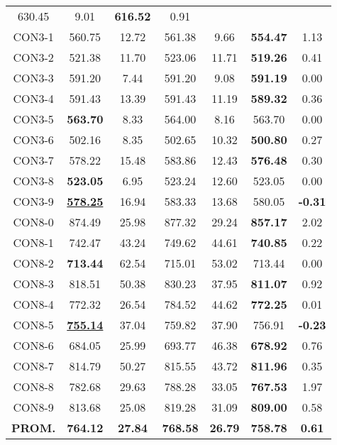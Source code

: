 \begin{table}[ht]
\begin{tabular}{c c c c c c c}
630.45 & 9.01 & \bf{616.52} & 
0.91\\CON3-1 & 560.75 & 12.72 & 
561.38 & 9.66 & \bf{554.47} & 
1.13\\CON3-2 & 521.38 & 11.70 & 
523.06 & 11.71 & \bf{519.26} & 
0.41\\CON3-3 & 591.20 & 7.44 & 
591.20 & 9.08 & \bf{591.19} & 
0.00\\CON3-4 & 591.43 & 13.39 & 
591.43 & 11.19 & \bf{589.32} & 
0.36\\CON3-5 & \bf{563.70} & 8.33 & 
564.00 & 8.16 & 563.70 & 0.00\\
CON3-6 & 502.16 & 8.35 & 
502.65 & 10.32 & \bf{500.80} & 
0.27\\CON3-7 & 578.22 & 15.48 & 
583.86 & 12.43 & \bf{576.48} & 
0.30\\CON3-8 & \bf{523.05} & 6.95 & 
523.24 & 12.60 & 523.05 & 0.00\\
CON3-9 & \bf{\underline{578.25}} & 16.94 & 
583.33 & 13.68 & 580.05 & 
\bf{-0.31}\\CON8-0 & 874.49 & 25.98 & 
877.32 & 29.24 & \bf{857.17} & 
2.02\\CON8-1 & 742.47 & 43.24 & 
749.62 & 44.61 & \bf{740.85} & 
0.22\\CON8-2 & \bf{713.44} & 62.54 & 
715.01 & 53.02 & 713.44 & 0.00\\
CON8-3 & 818.51 & 50.38 & 
830.23 & 37.95 & \bf{811.07} & 
0.92\\CON8-4 & 772.32 & 26.54 & 
784.52 & 44.62 & \bf{772.25} & 
0.01\\CON8-5 & \bf{\underline{755.14}} & 37.04 & 
759.82 & 37.90 & 756.91 & 
\bf{-0.23}\\CON8-6 & 684.05 & 25.99 & 
693.77 & 46.38 & \bf{678.92} & 
0.76\\CON8-7 & 814.79 & 50.27 & 
815.55 & 43.72 & \bf{811.96} & 
0.35\\CON8-8 & 782.68 & 29.63 & 
788.28 & 33.05 & \bf{767.53} & 
1.97\\CON8-9 & 813.68 & 25.08 & 
819.28 & 31.09 & \bf{809.00} & 
0.58\\\bf{PROM.} & 
\bf{764.12} & \bf{27.84} & \bf{768.58} & \bf{26.79} & \bf{758.78} & \bf{0.61}\\[1ex]\hline
\end{tabular}
\label{table:nonlin}
\end{table} \clearpage
